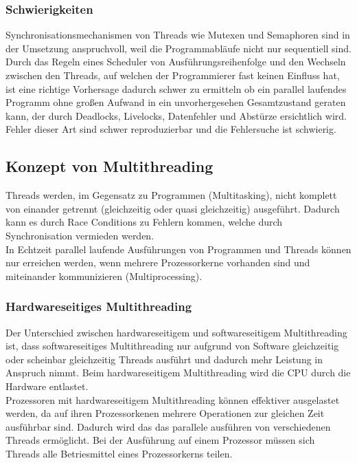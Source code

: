 \documentclass[12pt,a4paper]{report}
\begin{document}
\subsubsection{Schwierigkeiten}
Synchronisationsmechanismen von Threads wie Mutexen und Semaphoren sind in der Umsetzung anspruchvoll, weil die Programmabläufe nicht nur sequentiell sind. Durch das Regeln eines Scheduler von Ausführungsreihenfolge und den Wechseln zwischen den Threads, auf welchen der Programmierer fast keinen Einfluss hat, ist eine richtige Vorhersage dadurch schwer zu ermitteln ob ein parallel laufendes Programm ohne großen Aufwand in ein unvorhergesehen Gesamtzustand geraten kann, der durch Deadlocks, Livelocks, Datenfehler und Abstürze ersichtlich wird.\\
Fehler dieser Art sind schwer reproduzierbar und die Fehlersuche ist schwierig.


\subsection{Konzept von Multithreading}
Threads werden, im Gegensatz zu Programmen (Multitasking), nicht komplett von einander getrennt (gleichzeitig oder quasi gleichzeitig) ausgeführt. Dadurch kann es durch Race Conditions zu Fehlern kommen, welche durch Synchronisation vermieden werden.\\ 
In Echtzeit parallel laufende Ausführungen von Programmen und Threads können nur erreichen werden, wenn mehrere Prozessorkerne vorhanden sind und miteinander kommunizieren (Multiprocessing).

\subsubsection{Hardwareseitiges Multithreading}
Der Unterschied zwischen hardwareseitigem und softwareseitigem Multithreading ist, dass softwareseitiges Multithreading nur aufgrund von Software gleichzeitig oder scheinbar gleichzeitig Threads ausführt und dadurch mehr Leistung in Anspruch nimmt. Beim hardwareseitigem  Multithreading wird die CPU durch die Hardware entlastet.\\

Prozessoren mit hardwareseitigem Multithreading können effektiver ausgelastet werden, da auf ihren Prozessorkenen mehrere Operationen zur gleichen Zeit ausführbar sind. Dadurch wird das das parallele ausführen von verschiedenen Threads ermöglicht. Bei der Ausführung auf einem Prozessor müssen sich Threads alle Betriesmittel eines Prozessorkerns teilen.\\
\end{document}
